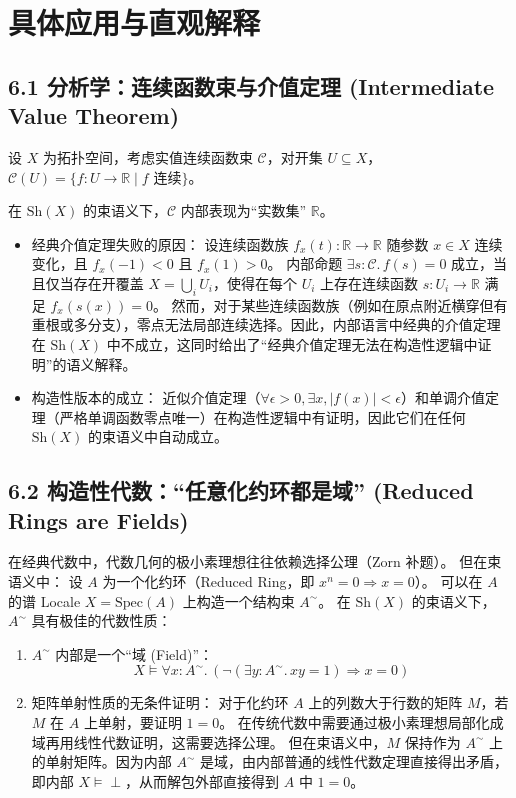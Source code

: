\documentclass[12pt,a4paper]{article}
\begin{document}
\section{具体应用与直观解释}

\subsection{6.1 分析学：连续函数束与介值定理 (Intermediate Value Theorem)}

设 $X$ 为拓扑空间，考虑实值连续函数束 $\mathcal{C}$，对开集 $U \subseteq X$，$\mathcal{C}(U) = \{ f: U \to \mathbb{R} \mid f \text{ 连续}\}$。

在 $\text{Sh}(X)$ 的束语义下，$\mathcal{C}$ 内部表现为“实数集” $\mathbb{R}$。

\begin{itemize}
  \item 经典介值定理失败的原因：
  设连续函数族 $f_x(t): \mathbb{R} \to \mathbb{R}$ 随参数 $x \in X$ 连续变化，且 $f_x(-1) < 0$ 且 $f_x(1) > 0$。
  内部命题 $\exists s: \mathcal{C}. \, f(s) = 0$ 成立，当且仅当存在开覆盖 $X = \bigcup_i U_i$，使得在每个 $U_i$ 上存在连续函数 $s: U_i \to \mathbb{R}$ 满足 $f_x(s(x)) = 0$。
  然而，对于某些连续函数族（例如在原点附近横穿但有重根或多分支），零点无法局部连续选择。因此，内部语言中经典的介值定理在 $\text{Sh}(X)$ 中不成立，这同时给出了“经典介值定理无法在构造性逻辑中证明”的语义解释。
  
  \item 构造性版本的成立：
  近似介值定理（$\forall \epsilon > 0, \exists x, \vert{}f(x)\vert{} < \epsilon$）和单调介值定理（严格单调函数零点唯一）在构造性逻辑中有证明，因此它们在任何 $\text{Sh}(X)$ 的束语义中自动成立。
\end{itemize}

\subsection{6.2 构造性代数：“任意化约环都是域” (Reduced Rings are Fields)}

在经典代数中，代数几何的极小素理想往往依赖选择公理（Zorn 补题）。
但在束语义中：
设 $A$ 为一个化约环（Reduced Ring，即 $x^n = 0 \Rightarrow x = 0$）。
可以在 $A$ 的谱 Locale $X = \text{Spec}(A)$ 上构造一个结构束 $A^\sim$。
在 $\text{Sh}(X)$ 的束语义下，$A^\sim$ 具有极佳的代数性质：

\begin{enumerate}
  \item $A^\sim$ 内部是一个“域 (Field)”：
  \[
  X \models \forall x : A^\sim. \, \left( \neg(\exists y : A^\sim. \, xy = 1) \Rightarrow x = 0 \right)
  \]
  
  \item 矩阵单射性质的无条件证明：
  对于化约环 $A$ 上的列数大于行数的矩阵 $M$，若 $M$ 在 $A$ 上单射，要证明 $1 = 0$。
  在传统代数中需要通过极小素理想局部化成域再用线性代数证明，这需要选择公理。
  但在束语义中，$M$ 保持作为 $A^\sim$ 上的单射矩阵。因为内部 $A^\sim$ 是域，由内部普通的线性代数定理直接得出矛盾，即内部 $X \models \perp$，从而解包外部直接得到 $A$ 中 $1 = 0$。
\end{enumerate}
\end{document}
